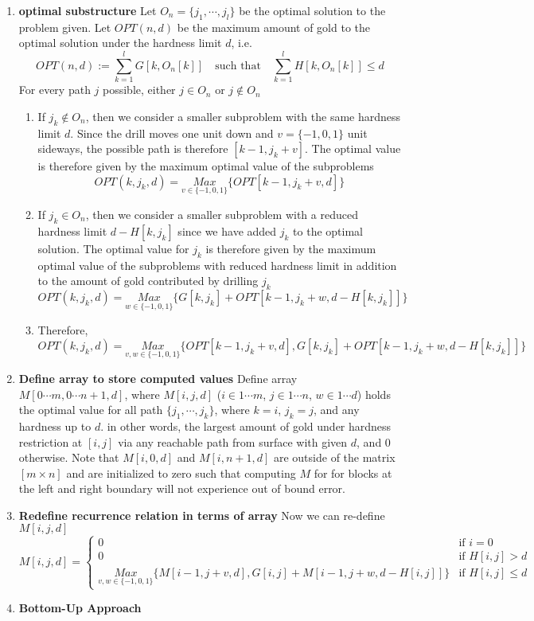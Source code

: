 \documentclass[11pt]{article}
\begin{document}
\begin{solution}
  \begin{enumerate}
    \item \textbf{optimal substructure} Let $O_n = \{ j_1,\cdots, j_l\}$ be the optimal solution to the problem given. Let $OPT(n, d)$ be the maximum amount of gold to the optimal solution under the hardness limit $d$, i.e.
    \[
      OPT(n, d) := \sum_{k=1}^{l} G[k, O_n[k]] \quad \text{such that}\quad \sum_{k=1}^{l} H[k, O_n[k]] \leq d
    \]
    For every path $j$ possible, either $j\in O_n$ or $j\not\in O_n$
    \begin{enumerate}
      \item If $j_k \not\in O_n$, then we consider a smaller subproblem with the same hardness limit $d$. Since the drill moves one unit down and $v = \{ -1, 0, 1\}$ unit sideways, the possible path is therefore $[k-1, j_k + v]$. The optimal value is therefore given by the maximum optimal value of the subproblems
      \[
        OPT(k, j_k, d) = \underset{v\in\{-1,0,1\}}{Max}\{ OPT[k-1, j_k + v, d]\}
      \]
      \item If $j_k \in O_n$, then we consider a smaller subproblem with a reduced hardness limit $d - H[k, j_k]$ since we have added $j_k$ to the optimal solution. The optimal value for $j_k$ is therefore given by the maximum optimal value of the subproblems with reduced hardness limit in addition to the amount of gold contributed by drilling $j_k$
      \[
        OPT(k, j_k, d) = \underset{w\in\{-1,0,1\}}{Max}\{ G[k, j_k] + OPT[k-1, j_k + w, d-H[k, j_k]]\}
      \]
      \item Therefore,
      \[
        OPT(k, j_k, d) = \underset{v, w\in\{-1,0,1\}}{Max}\{ OPT[k-1, j_k + v, d], G[k, j_k] + OPT[k-1, j_k + w, d-H[k, j_k]]\}
      \]
    \end{enumerate}

  \item \textbf{Define array to store computed values} Define array $M[0\cdots m, 0\cdots n + 1, d]$, where $M[i, j, d]$ ($i\in 1\cdots m$, $j\in 1\cdots n$, $w\in 1\cdots d$) holds the optimal value for all path $\{ j_1, \cdots, j_k\}$, where $k = i$, $j_k = j$, and any hardness up to $d$. in other words, the largest amount of gold under hardness restriction at $[i, j]$ via any reachable path from surface with given $d$, and 0 otherwise. Note that $M[i, 0, d]$ and $M[i, n+1, d]$ are outside of the matrix $[m\times n]$ and are initialized to zero such that computing $M$ for for blocks at the left and right boundary will not experience out of bound error.
  \item \textbf{Redefine recurrence relation in terms of array} Now we can re-define $M[i, j, d]$
  \[
    M[i, j, d] =
    \begin{cases}
      0 & \text{if } i = 0\\
      0 & \text{if } H[i, j] > d \\
      \underset{v, w\in\{-1,0,1\}}{Max}\{ M[i-1, j + v, d], G[i, j] + M[i-1, j + w, d-H[i, j]]\} & \text{if } H[i, j] \leq d
    \end{cases}
  \]
  \item \textbf{Bottom-Up Approach}


\end{enumerate}
\end{solution}
\end{document}
